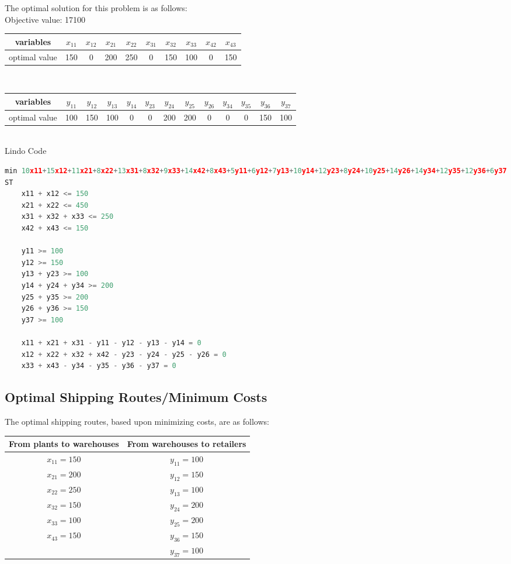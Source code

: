 \documentclass[11pt]{scrreprt}
\begin{document}
The optimal solution for this problem is as follows:\\

Objective value: 17100\\

\begin{tabular}{|c|c|c|c|c|c|c|c|c|c|}
	\hline variables & $x_{11}$   &  $x_{12}$ & $x_{21}$ & $x_{22}$ & $x_{31}$ & $x_{32}$ & $x_{33}$ & $x_{42}$ & $x_{43}$      \\
	\hline optimal value & 150  &  0 & 200 & 250 & 0 & 150 & 100 & 0 & 150            \\
	\hline
\end{tabular} \\

\begin{tabular}{|c|c|c|c|c|c|c|c|c|c|c|c|c|}
	\hline variables & $y_{11}$ & $y_{12}$ & $y_{13}$ & $y_{14}$ & $y_{23}$ & $y_{24}$ & $y_{25}$ & $y_{26}$ & $y_{34}$ & $y_{35}$ & $y_{36}$ & $y_{37}$  \\
	\hline optimal value & 	100 & 150 & 100 & 0 & 0 & 200 & 200 & 0 & 0 & 0 & 150 & 100 \\
	 \hline
\end{tabular} \\

Lindo Code

\begin{lstlisting}[language=c]
min 10x11+15x12+11x21+8x22+13x31+8x32+9x33+14x42+8x43+5y11+6y12+7y13+10y14+12y23+8y24+10y25+14y26+14y34+12y35+12y36+6y37
ST
	x11 + x12 <= 150
	x21 + x22 <= 450
	x31 + x32 + x33 <= 250
	x42 + x43 <= 150

	y11 >= 100
	y12 >= 150
	y13 + y23 >= 100
	y14 + y24 + y34 >= 200
	y25 + y35 >= 200
	y26 + y36 >= 150
	y37 >= 100

	x11 + x21 + x31 - y11 - y12 - y13 - y14 = 0
	x12 + x22 + x32 + x42 - y23 - y24 - y25 - y26 = 0
	x33 + x43 - y34 - y35 - y36 - y37 = 0
\end{lstlisting}

\subsection{Optimal Shipping Routes/Minimum Costs}
The optimal shipping routes, based upon minimizing costs, are as follows: \\

\begin{tabular}{|c|c|}
	\hline From plants to warehouses & From warehouses to retailers \\
	\hline $x_{11} = 150$ & $y_{11} = 100$ \\
	\hline $x_{21} = 200$ &$y_{12} = 150$ \\
	\hline $x_{22} = 250$ &$y_{13} = 100$ \\
	\hline $x_{32} = 150$ &$y_{24} = 200$ \\
	\hline $x_{33} = 100$ & $y_{25} = 200$  \\
	\hline $x_{43} = 150$ & $y_{36} = 150$  \\
	\hline & $y_{37} = 100$ \\
	\hline
\end{tabular} \\
\end{document}
